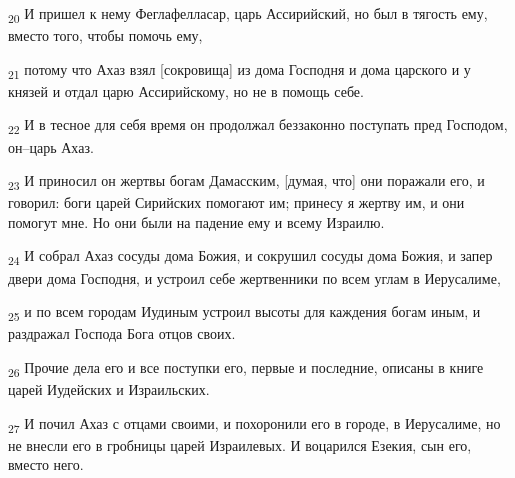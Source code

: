 \begin{tcolorbox}
\textsubscript{20} И пришел к нему Феглафелласар, царь Ассирийский, но был в тягость ему, вместо того, чтобы помочь ему,
\end{tcolorbox}
\begin{tcolorbox}
\textsubscript{21} потому что Ахаз взял [сокровища] из дома Господня и дома царского и у князей и отдал царю Ассирийскому, но не в помощь себе.
\end{tcolorbox}
\begin{tcolorbox}
\textsubscript{22} И в тесное для себя время он продолжал беззаконно поступать пред Господом, он--царь Ахаз.
\end{tcolorbox}
\begin{tcolorbox}
\textsubscript{23} И приносил он жертвы богам Дамасским, [думая, что] они поражали его, и говорил: боги царей Сирийских помогают им; принесу я жертву им, и они помогут мне. Но они были на падение ему и всему Израилю.
\end{tcolorbox}
\begin{tcolorbox}
\textsubscript{24} И собрал Ахаз сосуды дома Божия, и сокрушил сосуды дома Божия, и запер двери дома Господня, и устроил себе жертвенники по всем углам в Иерусалиме,
\end{tcolorbox}
\begin{tcolorbox}
\textsubscript{25} и по всем городам Иудиным устроил высоты для каждения богам иным, и раздражал Господа Бога отцов своих.
\end{tcolorbox}
\begin{tcolorbox}
\textsubscript{26} Прочие дела его и все поступки его, первые и последние, описаны в книге царей Иудейских и Израильских.
\end{tcolorbox}
\begin{tcolorbox}
\textsubscript{27} И почил Ахаз с отцами своими, и похоронили его в городе, в Иерусалиме, но не внесли его в гробницы царей Израилевых. И воцарился Езекия, сын его, вместо него.
\end{tcolorbox}
